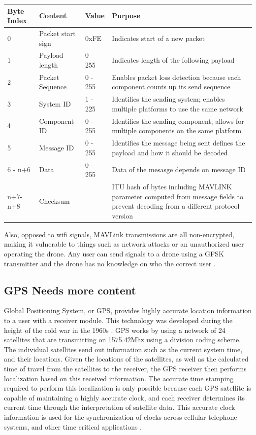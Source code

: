 \begin{table}[ht]
\centering
\begin{tabular}{|l|l|l|l|}
  \hline
  Byte Index & Content & Value &  Purpose \\ \hline
          0 &	Packet start sign &                  0xFE &       Indicates start of a new packet\\
          1 &   Payload length &                0 - 255 &       Indicates length of the following payload \\
          2 &   Packet Sequence &               0 - 255 &       Enables packet loss detection because each component counts up its send sequence \\
          3 &   System ID &            1 - 225 &  Identifies the sending system; enables multiple platforms to use the same network \\
          4 &   Component ID &         0 - 255 &  Identifies the sending component; allows for multiple components on the same platform \\
          5 &	Message ID &		   0 - 255 &  Identifies the message being sent defines the payload and how it should be decoded \\
          6 - n+6 &	Data & 			   0 - 255 & Data of the mesasge depends on message ID \\
          n+7-n+8 & Checksum & & ITU hash of bytes including MAVLINK parameter computed from message fields to prevent decoding from a different protocol version \\ \hline
\end{tabular}\end{table}
\par
Also, opposed to wifi signals, MAVLink transmissions are all non-encrypted, making it vulnerable to things such as network attacks or an unauthorized user operating the drone. Any user can send signals to a drone using a GFSK transmitter and the drone has no knowledge on who the correct user \cite{mavlink_vuln}.

\subsection{GPS \textbf{Needs more content}}
Global Positioning System, or GPS, provides highly accurate location information to a user with a receiver module. This technology was developed during the height of the cold war in the 1960s \cite{gps_info}. GPS works by using a network of 24 satellites that are transmitting on 1575.42Mhz using a division coding scheme. The individual satellites send out information such as the current system time, and their locations. Given the locations of the satellites, as well as the calculated time of travel from the satellites to the receiver, the GPS receiver then performs localization based on this received information. The accurate time stamping required to perform this localization is only possible because each GPS satellite is capable of maintaining a highly accurate clock, and each receiver determines its current time through the interpretation of satellite data. This accurate clock information is used for the synchronization of clocks across cellular telephone systems, and other time critical applications \cite{GPS_Book}.

